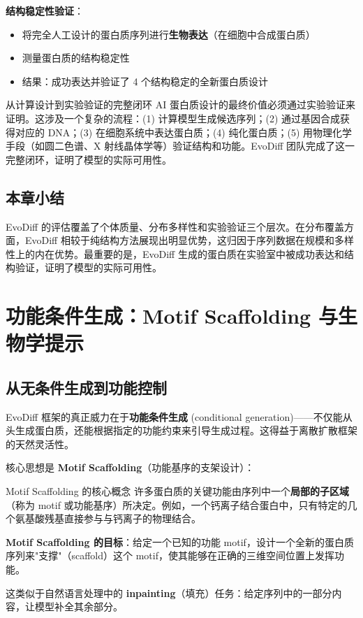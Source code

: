 \documentclass[a4paper]{article}
\begin{document}
\textbf{结构稳定性验证}：
\begin{itemize}
    \item 将完全人工设计的蛋白质序列进行\textbf{生物表达}（在细胞中合成蛋白质）
    \item 测量蛋白质的结构稳定性
    \item 结果：成功表达并验证了 4 个结构稳定的全新蛋白质设计
\end{itemize}

\begin{knowledgebox}{从计算设计到实验验证的完整闭环}
AI 蛋白质设计的最终价值必须通过实验验证来证明。这涉及一个复杂的流程：(1) 计算模型生成候选序列；(2) 通过基因合成获得对应的 DNA；(3) 在细胞系统中表达蛋白质；(4) 纯化蛋白质；(5) 用物理化学手段（如圆二色谱、X 射线晶体学等）验证结构和功能。EvoDiff 团队完成了这一完整闭环，证明了模型的实际可用性。
\end{knowledgebox}

\subsection{本章小结}

EvoDiff 的评估覆盖了个体质量、分布多样性和实验验证三个层次。在分布覆盖方面，EvoDiff 相较于纯结构方法展现出明显优势，这归因于序列数据在规模和多样性上的内在优势。最重要的是，EvoDiff 生成的蛋白质在实验室中被成功表达和结构验证，证明了模型的实际可用性。


\section{功能条件生成：Motif Scaffolding 与生物学提示}

\subsection{从无条件生成到功能控制}

EvoDiff 框架的真正威力在于\textbf{功能条件生成} (conditional generation)——不仅能从头生成蛋白质，还能根据指定的功能约束来引导生成过程。这得益于离散扩散框架的天然灵活性。

核心思想是 \textbf{Motif Scaffolding}（功能基序的支架设计）：

\begin{importantbox}{Motif Scaffolding 的核心概念}
许多蛋白质的关键功能由序列中一个\textbf{局部的子区域}（称为 motif 或功能基序）所决定。例如，一个钙离子结合蛋白中，只有特定的几个氨基酸残基直接参与与钙离子的物理结合。

\textbf{Motif Scaffolding 的目标}：给定一个已知的功能 motif，设计一个全新的蛋白质序列来"支撑"（scaffold）这个 motif，使其能够在正确的三维空间位置上发挥功能。

这类似于自然语言处理中的 \textbf{inpainting}（填充）任务：给定序列中的一部分内容，让模型补全其余部分。
\end{importantbox}
\end{document}
